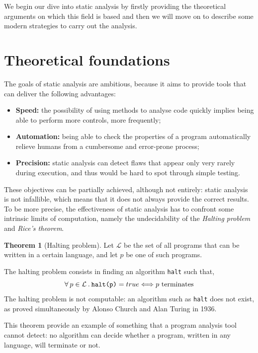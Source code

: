 \documentclass[12pt,a4paper]{book}
\newcommand{\st}{\hspace{2px}.\hspace{2px}}
\theoremstyle{definition}
\begin{document}
	We begin our dive into static analysis by firstly providing the theoretical arguments on which this field is based and then we will move on to describe some modern strategies to carry out the analysis.
	\section{Theoretical foundations}
	The goals of static analysis are ambitious, because it aims to provide tools that can deliver the following advantages:
	\begin{itemize}
		\item \textbf{Speed:} the possibility of using methods to analyse code quickly implies being able to perform more controls, more frequently; 
		\item \textbf{Automation:} being able to check the properties of a program automatically relieve humans from a cumbersome and error-prone process;
		\item \textbf{Precision:} static analysis can detect flaws that appear only very rarely during execution, and thus would be hard to spot through simple testing.
	\end{itemize}
	These objectives can be partially achieved, although not entirely:  static analysis is not infallible, which means that it does not always provide the correct results. To be more precise, the effectiveness of static analysis has to confront some intrinsic limits of computation, namely the undecidability of the \textit{Halting problem} and \textit{Rice's theorem}. 
	\theoremstyle{theorem}
	\newtheorem{thm}{Theorem}
	\begin{thm}[Halting problem] Let $\mathcal{L}$ be the set of all programs that can be written in a certain language, and let $p$ be one of such programs. 
		
		The halting problem consists in finding an algorithm \texttt{halt} such that,  
		\[
		\forall\hspace{2px}p\in\mathcal{L}\st\texttt{halt(p)} = true \Longleftrightarrow p\text{ terminates}
		\]
		The halting problem is not computable: an algorithm such as \texttt{halt} does not exist, as proved simultaneously by Alonso Church \cite{Church1936} and Alan Turing \cite{Turing1937} in 1936.
	\end{thm}
	This theorem provide an example of something that a program analysis tool cannot detect: no algorithm can decide whether a program, written in any language, will terminate or not.
	
\end{document}
